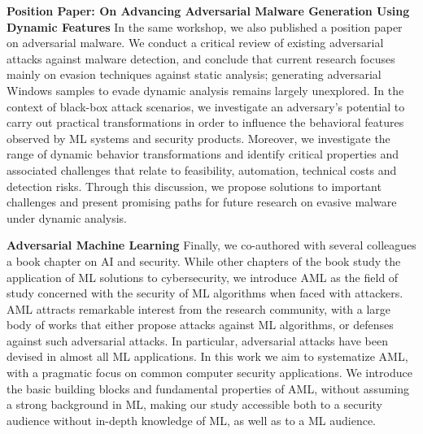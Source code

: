 \begin{myleftbar}
\end{myleftbar}

\textbf{Position Paper: On Advancing Adversarial Malware Generation Using Dynamic Features}
In the same workshop, we also published a position paper on adversarial malware.
We conduct a critical review of existing adversarial attacks against malware detection, and conclude that current research focuses mainly on evasion techniques against static analysis; generating adversarial Windows samples to evade dynamic analysis remains largely unexplored.
In the context of black-box attack scenarios, we investigate an adversary's potential to carry out practical transformations in order to influence the behavioral features observed by ML systems and security products.
Moreover, we investigate the range of dynamic behavior transformations and identify critical properties and associated challenges that relate to feasibility, automation, technical costs and detection risks.
Through this discussion, we propose solutions to important challenges and present promising paths for future research on evasive malware under dynamic analysis.

\begin{myleftbar}
\end{myleftbar}

\textbf{Adversarial Machine Learning}
Finally, we co-authored with several colleagues a book chapter on \gls{AI} and security.
While other chapters of the book study the application of ML solutions to cybersecurity, we introduce \gls{AML} as the field of study concerned with the security of ML algorithms when faced with attackers.
\gls{AML} attracts remarkable interest from the research community, with a large body of works that either propose attacks against \gls{ML} algorithms, or defenses against such adversarial attacks.
In particular, adversarial attacks have been devised in almost all \gls{ML} applications.
In this work we aim to systematize \gls{AML}, with a pragmatic focus on common computer security applications.
We introduce the basic building blocks and fundamental properties of \gls{AML}, without assuming a strong background in \gls{ML}, making our study accessible both to a security audience without in-depth knowledge of \gls{ML}, as well as to a \gls{ML} audience.

\begin{myleftbar}
\end{myleftbar}

